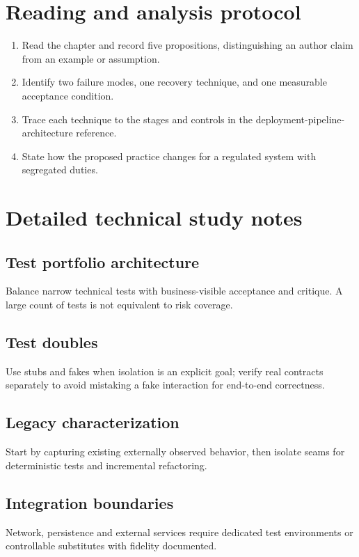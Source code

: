 \documentclass[10pt,letterpaper]{article}
\begin{document}
\section{Reading and analysis protocol}
\begin{enumerate}
\item Read the chapter and record five propositions, distinguishing an author claim from an example or assumption.
\item Identify two failure modes, one recovery technique, and one measurable acceptance condition.
\item Trace each technique to the stages and controls in the deployment-pipeline-architecture reference.
\item State how the proposed practice changes for a regulated system with segregated duties.
\end{enumerate}

\section{Detailed technical study notes}
\subsection{Test portfolio architecture}
Balance narrow technical tests with business-visible acceptance and critique. A large count of tests is not equivalent to risk coverage.

\subsection{Test doubles}
Use stubs and fakes when isolation is an explicit goal; verify real contracts separately to avoid mistaking a fake interaction for end-to-end correctness.

\subsection{Legacy characterization}
Start by capturing existing externally observed behavior, then isolate seams for deterministic tests and incremental refactoring.

\subsection{Integration boundaries}
Network, persistence and external services require dedicated test environments or controllable substitutes with fidelity documented.
\end{document}
